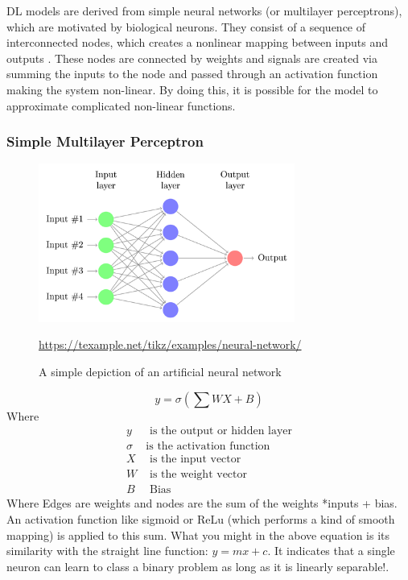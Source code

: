 DL models are derived from simple neural networks (or multilayer perceptrons), which are motivated by biological neurons. They consist of a sequence of interconnected nodes, which creates a nonlinear mapping between inputs and outputs \cite{gardner1998artificial}. These nodes are connected by weights and signals are created via summing the inputs to the node and passed through an activation function making the system non-linear. By doing this, it is possible for the model to approximate complicated non-linear functions.
 
 \subsubsection*{Simple Multilayer Perceptron}
 
 \begin{figure}[h]
 	\includegraphics[width=0.75\textwidth]{../Figures/neural-network.png}
 	\caption[An ANN]{A simple depiction of an artificial neural network} \url{https://texample.net/tikz/examples/neural-network/}
 	\label{fig:appendix-mlp}
 \end{figure}
 
 \begin{equation*}
 	y =  \sigma\left(\sum WX + B\right)
 \end{equation*}
 Where
 \begin{align*}
 	y &  \text{ is the output or hidden layer} \\
 	\sigma &  \text{is the activation function} \\
 	X &  \text{ is the input vector} \\
 	W &  \text{ is the weight vector} \\
 	B &  \text{ Bias}
 \end{align*}
 Where Edges are weights and nodes are the sum of the weights *inputs + bias. An activation function like sigmoid or ReLu (which performs a kind of smooth mapping) is applied to this sum. What you might in the above equation is its similarity with the straight line function: $y = mx + c$. It indicates that a single neuron can learn to class a binary problem as long as it is linearly separable!. \\
 
